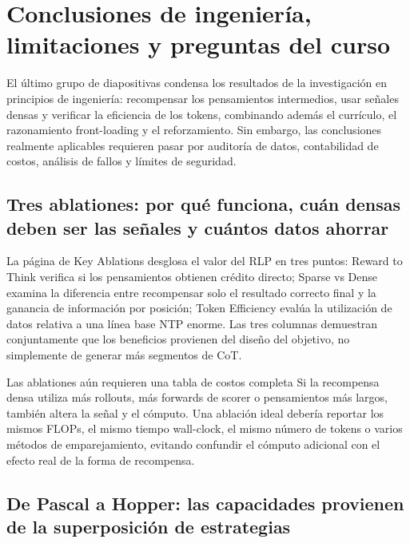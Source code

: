 \section{Conclusiones de ingeniería, limitaciones y preguntas del curso}

El último grupo de diapositivas condensa los resultados de la investigación en principios de ingeniería: recompensar los pensamientos intermedios, usar señales densas y verificar la eficiencia de los tokens, combinando además el currículo, el razonamiento front-loading y el reforzamiento. Sin embargo, las conclusiones realmente aplicables requieren pasar por auditoría de datos, contabilidad de costos, análisis de fallos y límites de seguridad.

\subsection{Tres ablationes: por qué funciona, cuán densas deben ser las señales y cuántos datos ahorrar}

La página de Key Ablations desglosa el valor del RLP en tres puntos: Reward to Think verifica si los pensamientos obtienen crédito directo; Sparse vs Dense examina la diferencia entre recompensar solo el resultado correcto final y la ganancia de información por posición; Token Efficiency evalúa la utilización de datos relativa a una línea base NTP enorme. Las tres columnas demuestran conjuntamente que los beneficios provienen del diseño del objetivo, no simplemente de generar más segmentos de CoT.


\begin{warningbox}{Las ablationes aún requieren una tabla de costos completa}
Si la recompensa densa utiliza más rollouts, más forwards de scorer o pensamientos más largos, también altera la señal y el cómputo. Una ablación ideal debería reportar los mismos FLOPs, el mismo tiempo wall-clock, el mismo número de tokens o varios métodos de emparejamiento, evitando confundir el cómputo adicional con el efecto real de la forma de recompensa.
\end{warningbox}

\subsection{De Pascal a Hopper: las capacidades provienen de la superposición de estrategias}

